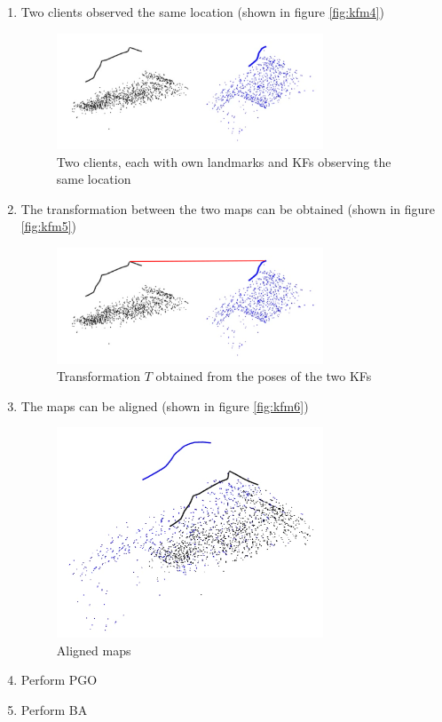 \begin{enumerate}
  \item {Two clients observed the same location (shown in figure \autoref{fig:kfm4})
    \begin{figure}[H]
      \centering
      \includegraphics[width=0.75\textwidth]{images/map_1_2_1}
      \caption{Two clients, each with own landmarks and \acp{KF} observing the same location}
      \label{fig:kfm4}
    \end{figure}}
  \item {The transformation between the two maps can be obtained (shown in figure \autoref{fig:kfm5})
    \begin{figure}[H]
      \centering
      \includegraphics[width=0.75\textwidth]{images/map_1_2_2}
      \caption{Transformation $T$ obtained from the poses of the two \acp{KF}}
      \label{fig:kfm5}
    \end{figure}}
  \item {The maps can be aligned (shown in figure \autoref{fig:kfm6})
    \begin{figure}[H]
      \centering
      \includegraphics[width=0.75\textwidth]{images/map_1_2_merge}
      \caption{Aligned maps}
      \label{fig:kfm6}
    \end{figure}}
  \item Perform \acf{PGO}
  \item Perform \acf{BA}
\end{enumerate}

